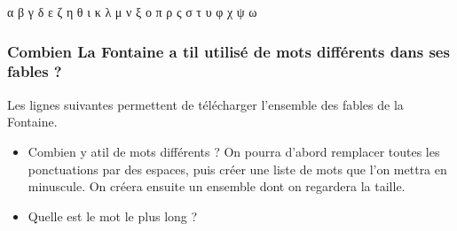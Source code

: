 \documentclass[letterpaper,10pt,english]{sphinxhowto}
\begin{document}
\begin{sphinxVerbatim}[commandchars=\\\{\}]
α β γ δ ε ζ η θ ι κ λ μ ν ξ ο π ρ ς σ τ υ φ χ ψ ω
\end{sphinxVerbatim}


\subsubsection{Combien La Fontaine a t\sphinxhyphen{}il utilisé de mots différents dans ses fables ?}
\label{\detokenize{cours4_chaine_caractere_corr_exercices:combien-la-fontaine-a-t-il-utilise-de-mots-differents-dans-ses-fables}}
\sphinxAtStartPar
Les lignes suivantes permettent de télécharger l’ensemble des fables de la Fontaine.
\begin{itemize}
\item {} 
\sphinxAtStartPar
Combien y a\sphinxhyphen{}t\sphinxhyphen{}il de mots différents ? On pourra d’abord remplacer toutes les ponctuations par des espaces, puis créer une liste de mots que l’on mettra en minuscule. On créera ensuite un ensemble dont on regardera la taille.

\item {} 
\sphinxAtStartPar
Quelle est le mot le plus long ?

\end{itemize}

\begin{sphinxVerbatim}[commandchars=\\\{\}]
 

  

  
\end{sphinxVerbatim}

\begin{sphinxVerbatim}[commandchars=\\\{\}]
   
       
    
  
  \PYG{p}{[}    \PYG{p}{]}
  

\end{sphinxVerbatim}
\end{document}
